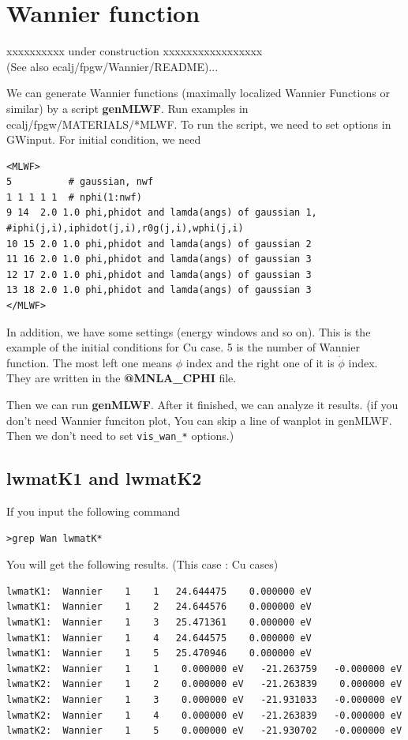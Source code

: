 \documentclass[a4paper,10pt,epsf,fleqn]{article}
\newcommand{\exe}[1]{{\bf #1}\index{#1}}
\newcommand{\io}[1]{{\sf  #1}\index{#1}}
\begin{document}
{\section{Wannier function }
xxxxxxxxxx under construction xxxxxxxxxxxxxxxxx\\
(See also ecalj/fpgw/Wannier/README)...

We can generate Wannier functions 
(maximally localized Wannier Functions or similar) 
by a script \exe{genMLWF}.
Run examples in \io{ecalj/fpgw/MATERIALS/*MLWF}.
To run the script, we need to set options in GWinput.
For initial condition, we need
\begin{verbatim}
<MLWF>
5          # gaussian, nwf
1 1 1 1 1  # nphi(1:nwf)
9 14  2.0 1.0 phi,phidot and lamda(angs) of gaussian 1, #iphi(j,i),iphidot(j,i),r0g(j,i),wphi(j,i)
10 15 2.0 1.0 phi,phidot and lamda(angs) of gaussian 2
11 16 2.0 1.0 phi,phidot and lamda(angs) of gaussian 3
12 17 2.0 1.0 phi,phidot and lamda(angs) of gaussian 3
13 18 2.0 1.0 phi,phidot and lamda(angs) of gaussian 3
</MLWF>
\end{verbatim}
In addition, we have some settings (energy windows and so on).
This is the example of the initial conditions for Cu case. 
5 is the number of Wannier function. The most left one means $\phi$ index and the right one of it is $\dot\phi$ index. They are written in the {\bf @MNLA\_CPHI} file.

Then we can run \exe{genMLWF}. 
After it finished, we can analyze it results.
(if you don't need Wannier funciton plot, 
You can skip a line of wanplot in genMLWF. Then we  don't need to set
\verb+vis_wan_*+ options.)

\subsection{lwmatK1 and lwmatK2}
If you input the following command
\begin{verbatim}
>grep Wan lwmatK*
\end{verbatim}

You will get the following results. (This case : Cu cases)
\begin{verbatim}
lwmatK1:  Wannier    1    1   24.644475    0.000000 eV
lwmatK1:  Wannier    1    2   24.644576    0.000000 eV
lwmatK1:  Wannier    1    3   25.471361    0.000000 eV
lwmatK1:  Wannier    1    4   24.644575    0.000000 eV
lwmatK1:  Wannier    1    5   25.470946    0.000000 eV
lwmatK2:  Wannier    1    1    0.000000 eV   -21.263759   -0.000000 eV
lwmatK2:  Wannier    1    2    0.000000 eV   -21.263839    0.000000 eV
lwmatK2:  Wannier    1    3    0.000000 eV   -21.931033   -0.000000 eV
lwmatK2:  Wannier    1    4    0.000000 eV   -21.263839   -0.000000 eV
lwmatK2:  Wannier    1    5    0.000000 eV   -21.930702   -0.000000 eV
\end{verbatim}


}
\end{document}
